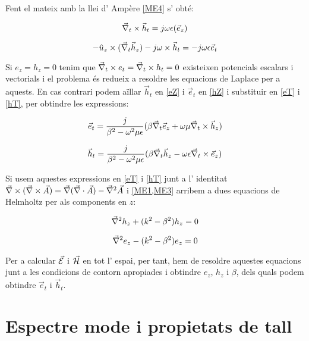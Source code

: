 Fent el mateix amb la llei d' Ampère \cref{ME4} s' obté:

\begin{equation}
  \vec \nabla _t \times \vec h_t = j \omega\epsilon(\vec e_z) \label{hT}
\end{equation}

\begin{equation}
  -\hat u_z \times (\vec \nabla _t \vec h_z ) -j \omega \times \vec h_t = -j \omega \epsilon \vec e _t \label{hZ}
\end{equation}

Si $e_z = h_z = 0$ tenim que $\vec \nabla_t \times e_t = \vec \nabla_t \times h_t = 0$ existeixen potencials escalars i vectorials i el problema és redueix a resoldre les equacions de Laplace per a aquests. En cas contrari podem aïllar $\vec h_t $ en \cref{eZ} i $\vec e_t$ en \cref{hZ} i substituir en \cref{eT} i \cref{hT}, per obtindre les expressions:

\begin{equation}
  \label{soleT}
  \vec e_t = \frac{j}{\beta ^2 - \omega ^2 \mu\epsilon} (\beta \vec \nabla _t \vec e_z + \omega \mu \vec \nabla _t \times \vec h_z )
\end{equation}

\begin{equation}
  \label{solhT}
  \vec h_t = \frac{j}{\beta ^2 - \omega ^2 \mu\epsilon} (\beta \vec \nabla _t \vec h_z - \omega \epsilon \vec \nabla _t \times \vec e_z )
\end{equation}

Si usem aquestes expressions en \cref{eT} i \cref{hT} junt a l' identitat $\vec \nabla \times (\vec \nabla \times \vec A ) = \vec \nabla (\vec \nabla \cdot \vec A) - \vec \nabla ^2 \vec A$ i \cref{ME1,ME3} arribem a dues equacions de Helmholtz per als components en $z$:

\begin{equation}
  \label{helmhz}
  \vec \nabla ^2 h_z + (k^2 - \beta ^2) h_z = 0
\end{equation}

\begin{equation}
  \label{helmez}
  \vec \nabla ^2 e_z - (k^2 - \beta ^2) e_z = 0
\end{equation}

Per a calcular $\vec{\mathcal{E}}$ i $\vec{\mathcal{H}}$ en tot l' espai, per tant, hem de resoldre aquestes equacions junt a les condicions de contorn apropiades i obtindre $e_z$, $h_z$ i $\beta$, dels quals podem obtindre $\vec e_t$ i $\vec h_t$.

\section{Espectre mode i propietats de tall}

